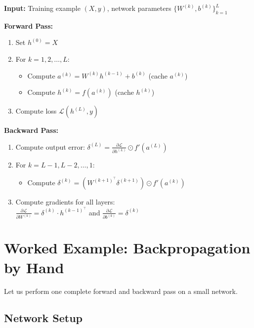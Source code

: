 \begin{algorithm}[Backpropagation]
\textbf{Input:} Training example $(X, y)$, network parameters $\{W^{(k)}, b^{(k)}\}_{k=1}^L$

\textbf{Forward Pass:}
\begin{enumerate}
    \item Set $h^{(0)} = X$
    \item For $k = 1, 2, \ldots, L$:
    \begin{itemize}
        \item Compute $a^{(k)} = W^{(k)} h^{(k-1)} + b^{(k)}$ \hfill (cache $a^{(k)}$)
        \item Compute $h^{(k)} = f(a^{(k)})$ \hfill (cache $h^{(k)}$)
    \end{itemize}
    \item Compute loss $\mathcal{L}(h^{(L)}, y)$
\end{enumerate}

\textbf{Backward Pass:}
\begin{enumerate}
    \item Compute output error: $\delta^{(L)} = \frac{\partial \mathcal{L}}{\partial h^{(L)}} \odot f'(a^{(L)})$
    \item For $k = L-1, L-2, \ldots, 1$:
    \begin{itemize}
        \item Compute $\delta^{(k)} = \left( W^{(k+1)^\top} \delta^{(k+1)} \right) \odot f'(a^{(k)})$
    \end{itemize}
    \item Compute gradients for all layers: \\
    $\frac{\partial \mathcal{L}}{\partial W^{(k)}} = \delta^{(k)} \cdot h^{(k-1)^\top}$ \quad and \quad $\frac{\partial \mathcal{L}}{\partial b^{(k)}} = \delta^{(k)}$
\end{enumerate}
\end{algorithm}

\section{Worked Example: Backpropagation by Hand}

Let us perform one complete forward and backward pass on a small network.

\subsection{Network Setup}

